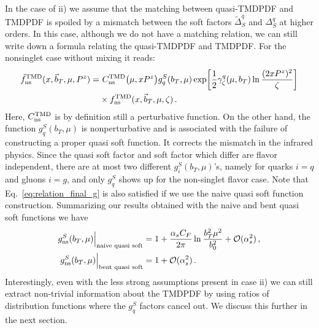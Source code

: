 \documentclass[11pt,a4paper]{article}
\DeclareRobustCommand{\eq}[1]{Eq.~\eqref{eq:#1}}
\newcommand{\cO}{\mathcal{O}}
\newcommand{\nn}{\nonumber}
\newcommand{\as}{\alpha_s}
\newcommand\TMD{\mathrm{TMD}}
\newcommand{\Lb}[1]{\ln^{#1}\frac{b_T^2 \mu^2}{b_0^2}}
\newcommand{\bt}{\vec b_T}
\newcommand{\ns}{{\rm ns}}
\begin{document}
In the case of ii) we assume that the matching between quasi-TMDPDF and TMDPDF is spoiled by a mismatch between the soft factors $\tilde\Delta_S^q$ and $\Delta_S^q$ at higher orders. In this case, although we do not have a matching relation, we can still write down a formula relating the quasi-TMDPDF and TMDPDF. For the nonsinglet case without mixing it reads:
\begin{align} \label{eq:relation_final_g}
 \tilde f_{\ns}^\TMD(x, \bt, \mu, P^z)
 = &~C^\TMD_{\ns}\bigl(\mu, x P^z\bigr)
   g^S_{q}(b_T, \mu)
   \exp\biggl[ \frac12  \gamma_\zeta^q(\mu, b_T) \ln\frac{(2 x P^z)^2}{\zeta} \biggr]
 \nn\\&\times
 f^\TMD_{\ns}(x, \bt, \mu, \zeta)
\,.\end{align}
Here, $C_\ns^\TMD$ is by definition still a perturbative function. On the other hand, the function $g^S_{q}(b_T,\mu)$ is nonperturbative and is associated with the failure of constructing a proper quasi soft function. It corrects the mismatch in the infrared physics.
Since the quasi soft factor and soft factor which differ are flavor independent, there are at most two different $g^S_i(b_T,\mu)$'s, namely for quarks $i=q$ and gluons $i=g$, and only $g^S_{q}$ shows up for the non-singlet flavor case. Note that \eq{relation_final_g} is also satisfied if we use the naive quasi soft function construction. Summarizing our results obtained with the naive and bent quasi soft functions we have
\begin{align}
 g^S_{\ns}(b_T,\mu) \Big|_{\text{naive quasi soft}} &= 1 + \frac{\as C_F}{2\pi} \Lb{} + \cO(\as^2)
 \,, \nn\\
 g^S_{\ns}(b_T,\mu) \Big|_{\text{bent quasi soft}} &= 1  + \cO(\as^2)
 \,.
\end{align}
Interestingly, even with the less strong assumptions present in case ii) we can still extract non-trivial information about the TMDPDF by using ratios of distribution functions where the $g_q^S$ factors cancel out. We discuss this further in the next section.


\end{document}
